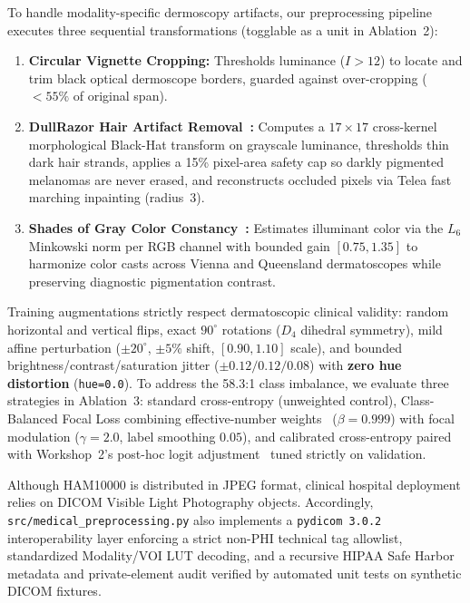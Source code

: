 To handle modality-specific dermoscopy artifacts, our preprocessing pipeline executes three sequential transformations (togglable as a unit in Ablation~2):
\begin{enumerate}
  \item \textbf{Circular Vignette Cropping:} Thresholds luminance ($I > 12$) to locate and trim black optical dermoscope borders, guarded against over-cropping ($<55\%$ of original span).
  \item \textbf{DullRazor Hair Artifact Removal~\cite{Lee1997dullrazor}:} Computes a $17\times 17$ cross-kernel morphological Black-Hat transform on grayscale luminance, thresholds thin dark hair strands, applies a 15\% pixel-area safety cap so darkly pigmented melanomas are never erased, and reconstructs occluded pixels via Telea fast marching inpainting (radius~3).
  \item \textbf{Shades of Gray Color Constancy~\cite{Finlayson2004shades}:} Estimates illuminant color via the $L_6$ Minkowski norm per RGB channel with bounded gain $[0.75, 1.35]$ to harmonize color casts across Vienna and Queensland dermatoscopes while preserving diagnostic pigmentation contrast.
\end{enumerate}

Training augmentations strictly respect dermatoscopic clinical validity: random horizontal and vertical flips, exact $90^\circ$ rotations ($D_4$ dihedral symmetry), mild affine perturbation ($\pm 20^\circ$, $\pm 5\%$ shift, $[0.90, 1.10]$ scale), and bounded brightness/contrast/saturation jitter ($\pm 0.12 / 0.12 / 0.08$) with \textbf{zero hue distortion} (\texttt{hue=0.0}). To address the 58.3:1 class imbalance, we evaluate three strategies in Ablation~3: standard cross-entropy (unweighted control), Class-Balanced Focal Loss combining effective-number weights~\cite{Cui2019class} ($\beta=0.999$) with focal modulation ($\gamma=2.0$, label smoothing $0.05$), and calibrated cross-entropy paired with Workshop~2's post-hoc logit adjustment~\cite{Menon2020long} tuned strictly on validation.

Although HAM10000 is distributed in JPEG format, clinical hospital deployment relies on DICOM Visible Light Photography objects. Accordingly, \texttt{src/medical\_preprocessing.py} also implements a \texttt{pydicom 3.0.2} interoperability layer enforcing a strict non-PHI technical tag allowlist, standardized Modality/VOI LUT decoding, and a recursive HIPAA Safe Harbor metadata and private-element audit verified by automated unit tests on synthetic DICOM fixtures.

